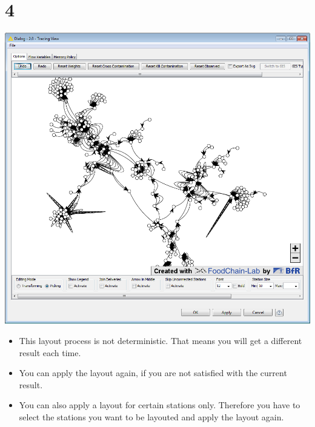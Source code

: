 \documentclass{beamer}
\begin{document}
\section{4}
\begin{frame}
	\begin{center}
  		\includegraphics[height=0.6\textheight]{4.png}
	\end{center}
	\begin{itemize}
		\item This layout process is not deterministic. That means you will get a different result each time.
		\item You can apply the layout again, if you are not satisfied with the current result.
		\item You can also apply a layout for certain stations only. Therefore you have to select the stations you want to be layouted and apply the layout again.
	\end{itemize}
\end{frame}
\end{document}
